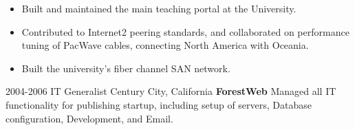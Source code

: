 \begin{entrylist}
{\begin{itemize}
        \item Built and maintained the main teaching portal at the University.
        \item Contributed to Internet2 peering standards, and collaborated on performance tuning of PacWave cables, connecting North America with Oceania.
        \item Built the university's fiber channel SAN network.
      \end{itemize}
    }
  \entry
    {2004-2006}
    {IT Generalist}
    {Century City, California}
    {
      \textbf{ForestWeb}
      \newline
     Managed all IT functionality for publishing startup, including setup of servers, Database configuration, Development, and Email.
    }
\end{entrylist}
